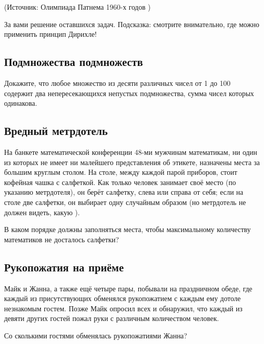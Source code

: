 (Источник:   Олимпиада Патнема 1960-х годов%
)


За вами решение оставшихся задач.
Подсказка: смотрите внимательно, где можно применить принцип Дирихле!








\subsection*{Подмножества подмножеств}%


Докажите, что любое множество из десяти различных чисел от 1 до 100 содержит два непересекающихся непустых подмножества, сумма чисел которых одинакова.


\subsection*{Вредный метрдотель}%


На банкете математической конференции 48-ми  мужчинам математикам, ни один из которых не имеет ни малейшего представления об этикете, назначены места за большим круглым столом. На столе, между каждой парой приборов, стоит кофейная чашка с салфеткой.
Как только человек занимает своё место (по указанию метрдотеля), он берёт салфетку, слева или справа от себя; если на столе две салфетки, он выбирает одну случайным образом (но метрдотель не должен видеть, какую ).

В каком порядке должны заполняться места, чтобы максимальному количеству математиков  %
не досталось салфетки?




\subsection*{Рукопожатия на приёме}%


Майк и Жанна, а также ещё четыре пары, побывали на праздничном обеде, где каждый из присутствующих обменялся рукопожатием с каждым ему дотоле незнакомым гостем. Позже Майк опросил всех и обнаружил, что каждый из девяти других  гостей пожал руки с различным количеством человек. 


  Со сколькими гостями обменялась рукопожатиями Жанна?





